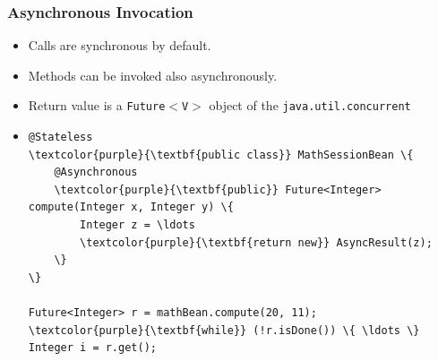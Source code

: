 \documentclass[10pt,xcolor=pdflatex]{beamer}
\begin{document}
\begin{frame}[fragile]\frametitle{Asynchronous Invocation}
	\begin{itemize}
        \item Calls are synchronous by default.
		\item Methods can be invoked also asynchronously.
		\item Return value is a \texttt{Future$<$V$>$} object of the \texttt{java.util.concurrent}
		\item []
        	\medskip
            \begin{Verbatim}[fontsize=\footnotesize, commandchars=\\\{\}]
@Stateless
\textcolor{purple}{\textbf{public class}} MathSessionBean \{
    @Asynchronous
    \textcolor{purple}{\textbf{public}} Future<Integer> compute(Integer x, Integer y) \{
        Integer z = \ldots
        \textcolor{purple}{\textbf{return new}} AsyncResult(z);
    \}
\}

Future<Integer> r = mathBean.compute(20, 11);
\textcolor{purple}{\textbf{while}} (!r.isDone()) \{ \ldots \}
Integer i = r.get();
			\end{Verbatim}
	\end{itemize}
\end{frame}
\end{document}
